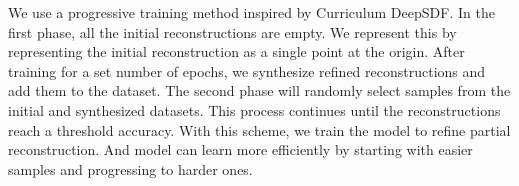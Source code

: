 We use a progressive training method inspired by Curriculum DeepSDF. In the first phase, all the initial reconstructions are empty. We represent this by representing the initial reconstruction as a single point at the origin. After training for a set number of epochs, we synthesize refined reconstructions and add them to the dataset. The second phase will randomly select samples from the initial and synthesized datasets. This process continues until the reconstructions reach a threshold accuracy. With this scheme, we train the model to refine partial reconstruction. And model can learn more efficiently by starting with easier samples and progressing to harder ones.
